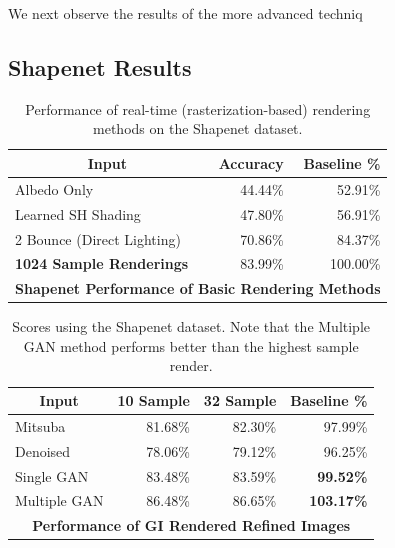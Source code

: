 \documentclass[10pt,twocolumn,letterpaper]{article}
\begin{document}
We next observe the results of the more advanced techniq
\subsection{Shapenet Results}

\begin{table}[]
\centering
\begin{tabular}{|l|r|r|}
\hline
\multicolumn{1}{|c|}{\textbf{Input}}
& \multicolumn{1}{r|}{\textbf{Accuracy}}
& \multicolumn{1}{r|}{\textbf{Baseline \%}} \\ \hline
Albedo Only 				&44.44\%	& 52.91\%	\\
Learned SH Shading			&47.80\%	& 56.91\%	\\
2 Bounce (Direct Lighting)	&70.86\%	& 84.37\%   \\
\textbf{1024 Sample Renderings}		& 83.99\%	& 100.00\%	\\ \hline
\multicolumn{3}{|c|}{\textbf{Shapenet Performance of Basic Rendering Methods}}	\\ \hline
\end{tabular}
\caption{Performance of real-time (rasterization-based) rendering methods on the Shapenet dataset.}
\label{table:tblnonGI_sn}
\end{table}


\begin{table}[]
\centering
\begin{tabular}{|l|r|r|r|}
\hline
\multicolumn{1}{|c|}{\textbf{Input}}
& \multicolumn{1}{c|}{\textbf{10 Sample}}
& \multicolumn{1}{c|}{\textbf{32 Sample}}
& \multicolumn{1}{c|}{\textbf{Baseline \%}} \\ \hline
Mitsuba		& 81.68\%	& 82.30\%	& 97.99\% \\
Denoised	& 78.06\%	& 79.12\%	& 96.25\%	\\
Single GAN	& 83.48\%	& 83.59\%	& \textbf{99.52\%}	\\
Multiple GAN& 86.48\%	& 86.65\% 	& \textbf{103.17\%}		\\ \hline
\multicolumn{4}{|c|}{\textbf{Performance of GI Rendered Refined Images}}	\\ \hline
\end{tabular}
\caption{Scores using the Shapenet dataset. Note that the Multiple GAN method performs better than the highest sample render.
}
\label{tblallrefined}
\end{table}
\end{document}
